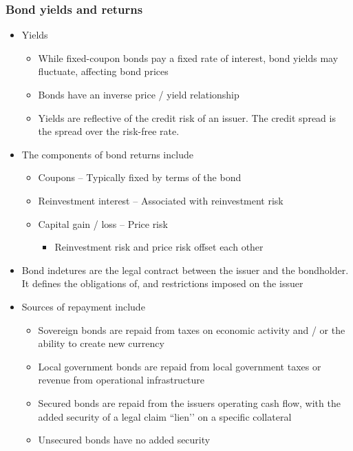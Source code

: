 \documentclass[../notes_compiled.tex]{subfiles}
\begin{document}
\subsubsection{Bond yields and returns}
\begin{itemize}
\item Yields
\begin{itemize}
\item While fixed-coupon bonds pay a fixed rate of interest, bond yields may fluctuate, affecting bond prices
\item Bonds have an inverse price / yield relationship
\item Yields are reflective of the credit risk of an issuer. The credit spread is the spread over the risk-free rate.
\end{itemize}
\item The components of bond returns include
\begin{itemize}
\item Coupons -- Typically fixed by terms of the bond
\item Reinvestment interest -- Associated with reinvestment risk
\item Capital gain / loss -- Price risk
\begin{itemize}
\item[] Reinvestment risk and price risk offset each other
\end{itemize}
\end{itemize}
\item Bond indetures are the legal contract between the issuer and the bondholder. It defines the obligations of, and restrictions imposed on the issuer
\item Sources of repayment include
\begin{itemize}
\item Sovereign bonds are repaid from taxes on economic activity and / or the ability to create new currency
\item Local government bonds are repaid from local government taxes or revenue from operational infrastructure
\item Secured bonds are repaid from the issuers operating cash flow, with the added security of a legal claim ``lien’’ on a specific collateral
\item Unsecured bonds have no added security
\end{itemize}
\end{itemize}
\end{document}
